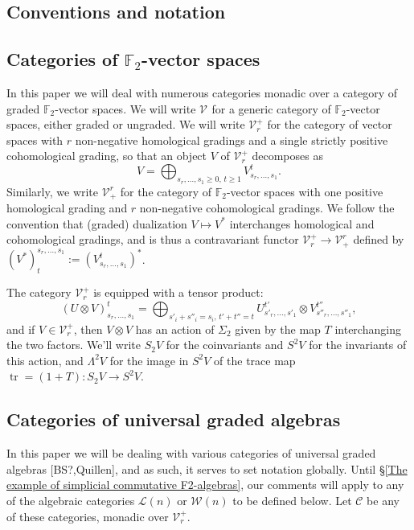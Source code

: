 \documentclass[11pt]{amsart}
\theoremstyle{plain}
\theoremstyle{definition}
\DeclareMathOperator{\trace}{tr}
\renewcommand{\to}{\longrightarrow}
\newcommand{\calW}{\mathcal{W}}
\newcommand{\calL}{\mathcal{L}}
\newcommand{\calC}{\mathcal{C}}
\newcommand{\calV}{\mathcal{V}}
\theoremstyle{plain}
\newcommand{\vect}[2]{\calV^{#1}_{#2}}
\newcommand{\F}{\mathbb{F}}
\begin{document}
\begin{Conventions and notation}
\vfil\pagebreak
\section{Conventions and notation}
\subsection{Categories of $\F_2$-vector spaces}

In this paper we will deal with numerous categories monadic over a category of graded $\F_2$-vector spaces. We will write $\vect{}{}$ for a generic category of $\F_2$-vector spaces, either graded or ungraded. We will write $\vect{+}{r}$ for the category of vector spaces with $r$ non-negative homological gradings and a single strictly positive cohomological grading, so that an object $V$ of $\vect{+}{r}$ decomposes as
\[V=\bigoplus_{s_r,\ldots,s_1\geq0,\,t\geq 1}V^{t}_{s_r,\ldots,s_1}.\]
Similarly, we write $\vect{r}{+}$ for the category of $\F_2$-vector spaces with one positive homological grading and $r$ non-negative cohomological gradings. We follow the convention that (graded) dualization $V\mapsto V^*$ interchanges homological and cohomological gradings, and is thus a contravariant functor $\vect{+}{r}\to\vect{r}{+}$ defined by $(V^*)^{s_r,\ldots,s_1}_{t}:=(V_{s_r,\ldots,s_1}^{t})^*$.

The category $\vect{+}{r}$ is equipped with a tensor product:
\[(U\otimes V)^t_{s_r,\ldots,s_1}=\bigoplus_{s'_i+s''_i=s_i,\,t'+t''=t}U^{t'}_{s'_r,\ldots,s'_1}\otimes V^{t''}_{s''_r,\ldots,s''_1},\]
and if $V\in \vect{+}{r}$, then $V\otimes V$ has an action of $\Sigma_2$ given by the map $T$ interchanging the two factors. We'll write $S_2V$ for the coinvariants and $S^2V$ for the invariants of this action, and $\Lambda^2V$ for the image in $S^2V$ of the trace map $\trace=(1+T):S_2V\to S^2V$.

\subsection{Categories of universal graded algebras}
In this paper we will be dealing with various categories of universal graded algebras [BS?,Quillen], and as such, it serves to set notation globally. Until \S\ref{The example of simplicial commutative F2-algebras}, our comments will apply to any of the algebraic categories $\calL(n)$ or $\calW(n)$ to be defined below. Let $\calC$ be any of these categories, monadic over $\vect{+}{r}$.


\end{Conventions and notation}
\end{document}
